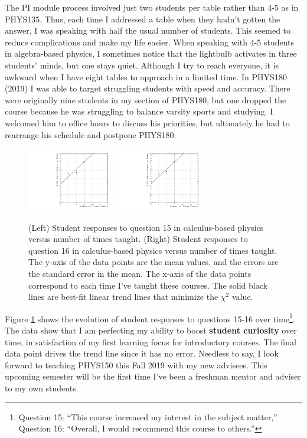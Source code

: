 \documentclass[../../main.tex]{subfiles}
\begin{document}
The PI module process involved just two students per table rather than 4-5 as in PHYS135.  Thus, each time I addressed a table when they hadn't gotten the answer, I was speaking with half the usual number of students.  This seemed to reduce complications and make my life easier.  When speaking with 4-5 students in algebra-based physics, I sometimes notice that the lightbulb activates in three students' minds, but one stays quiet.  Although I try to reach everyone, it is awkward when I have eight tables to approach in a limited time.  In PHYS180 (2019) I was able to target struggling students with speed and accuracy.  There were originally nine students in my section of PHYS180, but one dropped the course because he was struggling to balance varsity sports and studying.  I welcomed him to office hours to discuss his priorities, but ultimately he had to rearrange his schedule and postpone PHYS180. \\ \hspace{0.1cm}

\begin{figure}
\centering
\includegraphics[width=0.35\textwidth]{Q15_calculus_based.pdf}
\includegraphics[width=0.35\textwidth]{Q16_calculus_based.pdf}
\caption{\label{fig:courses:intro_q15_2}  (Left) Student responses to question 15 in calculus-based physics versus number of times taught. (Right) Student responses to question 16 in calculus-based physics versus number of times taught.  The y-axis of the data points are the mean values, and the errors are the standard error in the mean.  The x-axis of the data points correspond to each time I've taught these courses.  The solid black lines are best-fit linear trend lines that minimize the $\chi^2$ value.}
\end{figure}

Figure \ref{fig:courses:intro_q15_2} shows the evolution of student responses to questions 15-16 over time\footnote{Question 15: ``This course increased my interest in the subject matter,'' Question 16: ``Overall, I would recommend this course to others.''}.  The data show that I am perfecting my ability to boost \textbf{student curiosity} over time, in satisfaction of my first learning focus for introductory courses.  The final data point drives the trend line since it has no error.  Needless to say, I look forward to teaching PHYS150 this Fall 2019 with my new advisees.  This upcoming semester will be the first time I've been a freshman mentor and adviser to my own students. \\ \hspace{0.1cm}
\end{document}
